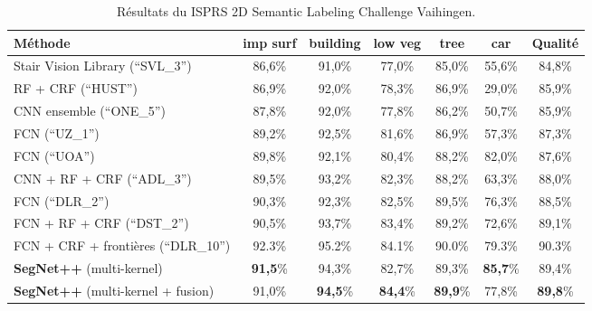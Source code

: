 \begin{table*}[t]
  \centering
  \caption{Résultats du ISPRS 2D Semantic Labeling Challenge Vaihingen.}
  \begin{tabularx}{\textwidth}{ Y c c c c c c }
  \toprule
  Méthode & imp surf & building & low veg & tree & car & Qualité \\
  \midrule
  Stair Vision Library {\scriptsize (``SVL\_3'')}\cite{gerke_use_2015} & 86,6\% &	91,0\% &	77,0\% &	85,0\%	& 55,6\% &	84,8\% \\
  RF + CRF {\scriptsize (``HUST'')}\cite{quang_efficient_2015} & 86,9\% & 92,0\% &	78,3\% &	86,9\% &	29,0\% &	85,9\% \\
  CNN ensemble {\scriptsize (``ONE\_5'')}\cite{boulch_dag_2015} & 87,8\% &	92,0\% &	77,8\% &	86,2\% &	50,7\% &	85,9\% \\
  FCN {\scriptsize (``UZ\_1'')}\cite{volpi_dense_2017} & 89,2\% &	92,5\% &	81,6\% &	86,9\% &	57,3\% &	87,3\% \\
  FCN {\scriptsize (``UOA'')}\cite{lin_efficient_2015} & 89,8\% &	92,1\% &	80,4\% &	88,2\% &	82,0\% &	87,6\% \\
  CNN + RF + CRF {\scriptsize (``ADL\_3'')}\cite{paisitkriangkrai_effective_2015} & 89,5\% &	93,2\% &	82,3\% &	88,2\% &	63,3\% &	88,0\% \\
  FCN {\scriptsize (``DLR\_2'')}\cite{marmanis_semantic_2016} & 90,3\% &	92,3\% &	82,5\% &	89,5\% &	76,3\% &	88,5\% \\
  FCN + RF + CRF {\scriptsize (``DST\_2'')}\cite{sherrah_fully_2016} & 90,5\% &	93,7\% &	83,4\% &	89,2\% &	72,6\% &	89,1\% \\
  FCN + CRF + frontières {\scriptsize (``DLR\_10'')}\cite{marmanis_classification_2017} & 92.3\% & 95.2\% & 84.1\% & 90.0\% & 79.3\% & 90.3\%\\
  \midrule
  \textbf{SegNet++} (multi-kernel)\cite{audebert_semantic_2016} & \textbf{91,5}\% &	94,3\% &	82,7\% &	89,3\% &	\textbf{85,7}\% &	89,4\% \\
  \textbf{SegNet++} (multi-kernel + fusion) & 91,0\% &	\textbf{94,5}\% &	\textbf{84,4}\% &	\textbf{89,9}\% &	77,8\% &	\textbf{89,8}\% \\
  \bottomrule
  \end{tabularx}
  \label{tab_leaderboard}
\end{table*}

